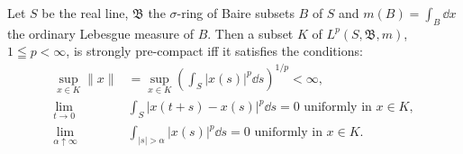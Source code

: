 \begin{theoremn} Let $S$ be the real line, $\mathfrak{B}$ the $\sigma$-ring of Baire subsets $B$ of $S$ and $m(B) = \int_{B} \dd x$ the ordinary Lebesgue measure of $B$. Then a subset $K$ of $L^{p}(S, \mathfrak{B}, m)$, $1 \leqq p < \infty$, is strongly pre-compact iff it satisfies the conditions:
\begin{align}
\sup\limits _{x \in K} \| x \|& = \sup\limits _{x \in K} \left(\int_{S} | x (s) | ^{p} \dd s\right) ^{1/p} < \infty , \label{eq:X.1.1} \\
\lim\limits _{t \to 0}& \int_{S} | x (t + s) - x (s) | ^{p} \dd s = 0 \text{ uniformly in } x \in K, \label{eq:X.1.2} \\
\lim\limits _{\alpha \uparrow \infty}& \int_{| s | > \alpha} | x (s) | ^{p} \dd s = 0 \text{ uniformly in } x \in K. \label{eq:X.1.3}
\end{align}

\end{theoremn}
